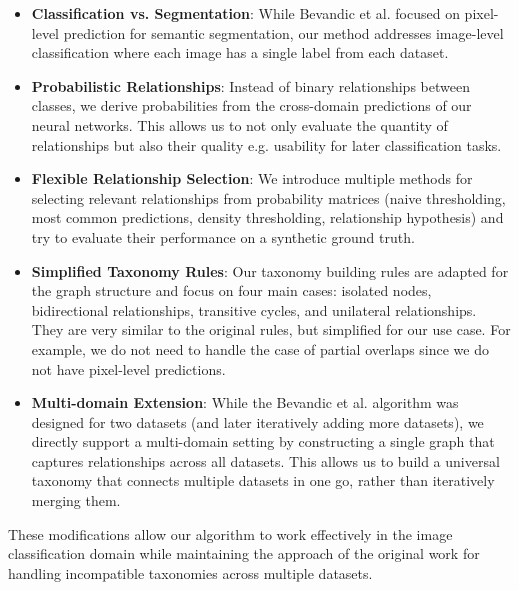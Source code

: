\begin{itemize}
      \item \textbf{Classification vs. Segmentation}: While Bevandic et al. focused on pixel-level prediction for semantic segmentation,
            our method addresses image-level classification where each image has a single label from each dataset.

      \item \textbf{Probabilistic Relationships}: Instead of binary relationships between classes,
            we derive probabilities from the cross-domain predictions of our neural networks.
            This allows us to not only evaluate the quantity of relationships but also their quality
            e.g. usability for later classification tasks.

      \item \textbf{Flexible Relationship Selection}: We introduce multiple methods for selecting relevant relationships from probability matrices (naive thresholding, most common predictions, density thresholding, relationship hypothesis)
            and try to evaluate their performance on a synthetic ground truth.

      \item \textbf{Simplified Taxonomy Rules}: Our taxonomy building rules are adapted for the graph structure and focus on four main cases: isolated nodes, bidirectional relationships, transitive cycles, and unilateral relationships.
            They are very similar to the original rules, but simplified for our use case.
            For example, we do not need to handle the case of partial overlaps since we do not have pixel-level predictions.

      \item \textbf{Multi-domain Extension}: While the Bevandic et al. algorithm was designed for two datasets
            (and later iteratively adding more datasets),
            we directly support a multi-domain setting by constructing a single graph
            that captures relationships across all datasets.
            This allows us to build a universal taxonomy that connects multiple datasets in one go,
            rather than iteratively merging them.
\end{itemize}

These modifications allow our algorithm to work effectively in the image classification domain
while maintaining the approach of the original work for handling incompatible taxonomies across multiple datasets.

